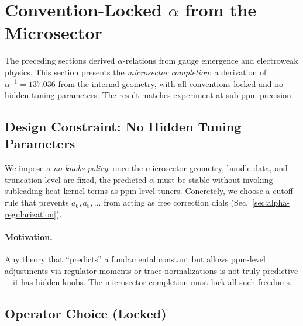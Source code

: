
\section{Convention-Locked \texorpdfstring{$\alpha$}{α} from the Microsector}\label{sec:alpha-locked}

The preceding sections derived $\alpha$-relations from gauge emergence and electroweak physics. This section presents the \textit{microsector completion}: a derivation of $\alpha^{-1} = 137.036$ from the internal geometry, with all conventions locked and no hidden tuning parameters. The result matches experiment at sub-ppm precision.

\subsection{Design Constraint: No Hidden Tuning Parameters}\label{sec:no-knobs-policy}

We impose a \emph{no-knobs policy}: once the microsector geometry, bundle data, and truncation level are fixed, the predicted $\alpha$ must be stable without invoking subleading heat-kernel terms as ppm-level tuners. Concretely, we choose a cutoff rule that prevents $a_6, a_8, \ldots$ from acting as free correction dials (Sec.~\ref{sec:alpha-regularization}).

\paragraph{Motivation.}
Any theory that ``predicts'' a fundamental constant but allows ppm-level adjustments via regulator moments or trace normalizations is not truly predictive---it has hidden knobs. The microsector completion must lock all such freedoms.

\subsection{Operator Choice (Locked)}\label{sec:alpha-operator-choice}

